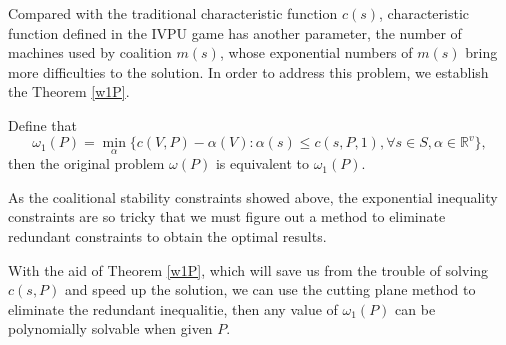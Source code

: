 Compared with the traditional characteristic function $c(s)$, characteristic function defined in the IVPU game has another parameter, the number of machines used by coalition $m(s)$, whose exponential numbers of $m(s)$ bring more difficulties to the solution.
In order to address this problem, we establish the Theorem \ref{w1P}.

\begin{thm}\label{w1P}
  Define that
  \[
    {\omega_1(P)}=\mathop{\min}_{\alpha}\{c(V,P)-\alpha(V): \alpha(s)\leq c(s,P,1), \forall s \in S, \alpha\in\mathbb{R}^{v}\},
  \]
then the original problem $\omega(P)$ is equivalent to $\omega_1(P)$.
\end{thm}

As the coalitional stability constraints showed above, the exponential inequality constraints are so tricky that we must figure out a method to eliminate redundant constraints to obtain the optimal results.

With the aid of Theorem \ref{w1P}, which will save us from the trouble of solving $c(s, P)$ and speed up the solution, we can use the cutting plane method to eliminate the redundant inequalitie, then  any value of $\omega_1(P)$ can be polynomially solvable when given $P$.
